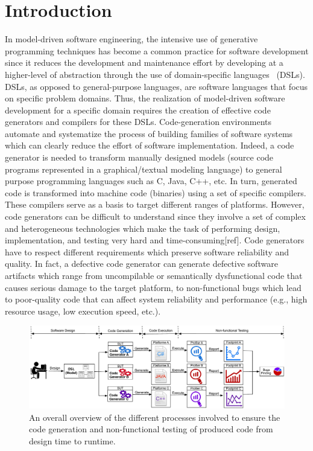 \section{Introduction}
In model-driven software engineering, the intensive use of generative programming techniques has become a common practice for software development since it reduces the development and maintenance effort by developing at a higher-level of abstraction through the use of domain-specific languages~\cite{brambilla2012model} (DSLs). 
DSLs, as opposed to general-purpose languages, are software languages that focus on specific problem domains. Thus, the realization of model-driven software development for a specific domain requires the creation of effective code generators and compilers for these DSLs.
Code-generation environments automate and systematize the process of building families of software systems which can clearly reduce the effort of software implementation.
Indeed, a code generator is needed to transform manually designed models (source code programs represented in a graphical/textual modeling language) to general purpose programming languages such as C, Java, C++, etc. In turn, generated code is transformed into machine code (binaries) using a set of specific compilers.
These compilers serve as a basis to target different ranges of platforms. 
However, code generators can be difficult to understand since they involve a set of complex and heterogeneous technologies which make the task of performing design, implementation, and testing very hard and time-consuming[ref]. Code generators have to respect different requirements which preserve software reliability and quality. In fact, a defective code generator can generate defective software artifacts which range from uncompilable or semantically dysfunctional code that causes serious damage to the target platform, to non-functional bugs which lead to poor-quality code that can affect system reliability and performance (e.g., high resource usage, low execution speed, etc.). 
\begin{figure}[h]
	\includegraphics[width=1\linewidth]{Ressources/background.pdf}
	\caption{An overall overview of the different processes involved to ensure the code generation and non-functional testing of produced code from design time to runtime.}
\end{figure}

